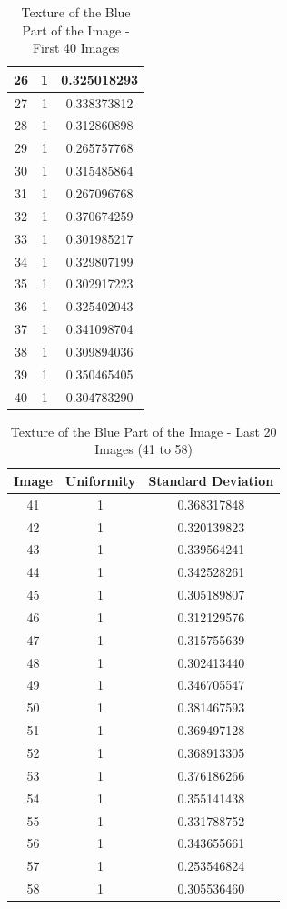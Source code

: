 \documentclass{article}
\begin{document}
\begin{table}[h!]
\begin{tabular}{|c|c|c|}
    26 & 1 & 0.325018293 \\ \hline
    27 & 1 & 0.338373812 \\ \hline
    28 & 1 & 0.312860898 \\ \hline
    29 & 1 & 0.265757768 \\ \hline
    30 & 1 & 0.315485864 \\ \hline
    31 & 1 & 0.267096768 \\ \hline
    32 & 1 & 0.370674259 \\ \hline
    33 & 1 & 0.301985217 \\ \hline
    34 & 1 & 0.329807199 \\ \hline
    35 & 1 & 0.302917223 \\ \hline
    36 & 1 & 0.325402043 \\ \hline
    37 & 1 & 0.341098704 \\ \hline
    38 & 1 & 0.309894036 \\ \hline
    39 & 1 & 0.350465405 \\ \hline
    40 & 1 & 0.304783290 \\ \hline
    \end{tabular}
    \caption{Texture of the Blue Part of the Image - First 40 Images}
    \label{tab:texture_blue_0140}
\end{table}

\begin{table}[h!]
    \centering
    \begin{tabular}{|c|c|c|}
    \hline
    Image & Uniformity & Standard Deviation \\ \hline
    41 & 1 & 0.368317848 \\ \hline
    42 & 1 & 0.320139823 \\ \hline
    43 & 1 & 0.339564241 \\ \hline
    44 & 1 & 0.342528261 \\ \hline
    45 & 1 & 0.305189807 \\ \hline
    46 & 1 & 0.312129576 \\ \hline
    47 & 1 & 0.315755639 \\ \hline
    48 & 1 & 0.302413440 \\ \hline
    49 & 1 & 0.346705547 \\ \hline
    50 & 1 & 0.381467593 \\ \hline
    51 & 1 & 0.369497128 \\ \hline
    52 & 1 & 0.368913305 \\ \hline
    53 & 1 & 0.376186266 \\ \hline
    54 & 1 & 0.355141438 \\ \hline
    55 & 1 & 0.331788752 \\ \hline
    56 & 1 & 0.343655661 \\ \hline
    57 & 1 & 0.253546824 \\ \hline
    58 & 1 & 0.305536460 \\ \hline
    \end{tabular}
    \caption{Texture of the Blue Part of the Image - Last 20 Images (41 to 58)}
    \label{tab:texture_blue_4158}
\end{table}
\end{document}
